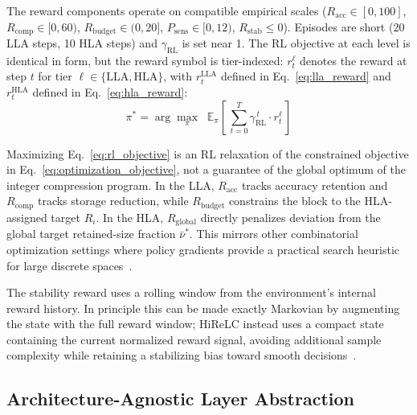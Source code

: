 \documentclass[preprint,12pt,authoryear]{elsarticle}
\begin{document}
The reward components operate on compatible empirical scales ($R_{\mathrm{acc}}
\in [0,100]$, $R_{\mathrm{comp}} \in [0,60)$, $R_{\mathrm{budget}} \in (0,20]$,
$P_{\mathrm{sens}} \in [0,12)$, $R_{\mathrm{stab}} \leq 0$). Episodes are short
(20 LLA steps, 10 HLA steps) and $\gamma_{\mathrm{RL}}$ is set near 1. The RL
objective at each level is identical in form, but the reward symbol is tier-indexed:
$r_t^{\ell}$ denotes the reward at step $t$ for tier $\ell \in
\{\mathrm{LLA},\mathrm{HLA}\}$, with $r_t^{\mathrm{LLA}}$ defined in
Eq.~\eqref{eq:lla_reward} and $r_t^{\mathrm{HLA}}$ defined in
Eq.~\eqref{eq:hla_reward}:
\begin{equation}
    \pi^* = \arg\max_{\pi} \;\;
    \mathbb{E}_{\pi}\!\left[\, \sum_{t=0}^{T} \gamma_{\mathrm{RL}}^{\,t} \cdot r_t^{\ell} \,\right]
    \label{eq:rl_objective}
\end{equation}

Maximizing Eq.~\eqref{eq:rl_objective} is an RL relaxation of the constrained objective
in Eq.~\eqref{eq:optimization_objective}, not a guarantee of the global optimum of the
integer compression program. In the LLA, $R_{\mathrm{acc}}$ tracks accuracy retention and
$R_{\mathrm{comp}}$ tracks storage reduction, while $R_{\mathrm{budget}}$ constrains the
block to the HLA-assigned target $R_i$. In the HLA, $R_{\mathrm{global}}$ directly
penalizes deviation from the global target retained-size fraction $\bar{\nu}^*$. This mirrors
other combinatorial optimization settings where policy gradients provide a practical
search heuristic for large discrete spaces~\citep{bello2016neural}.

The stability reward uses a rolling window from the environment's internal reward
history. In principle this can be made exactly Markovian by augmenting the state with the
full reward window; HiReLC instead uses a compact state containing the current normalized
reward signal, avoiding additional sample complexity while retaining a stabilizing bias
toward smooth decisions~\citep{nath2021revisiting,hessel2019inductive}.


\subsection{Architecture-Agnostic Layer Abstraction}
\end{document}
